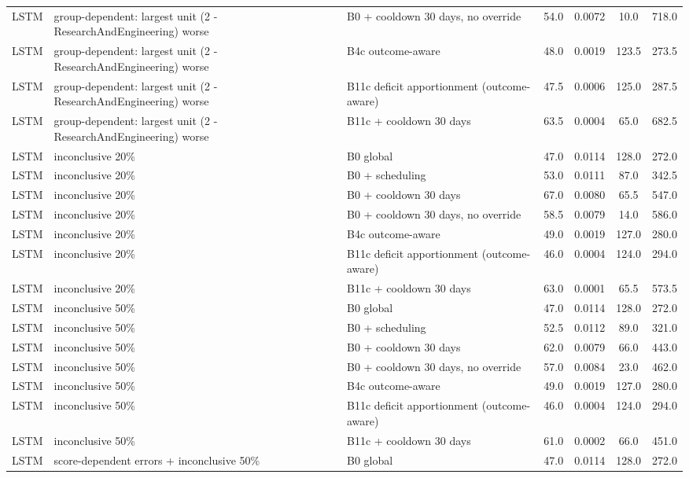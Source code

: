 \documentclass[10pt,onecolumn,letterpaper]{article}
\begin{document}
\begin{longtable}{lp{5.2cm}p{4.4cm}cccc}
LSTM & group-dependent: largest unit (2 - ResearchAndEngineering) worse & B0 + cooldown 30 days, no override & 54.0 & 0.0072 & 10.0 & 718.0 \\
LSTM & group-dependent: largest unit (2 - ResearchAndEngineering) worse & B4c outcome-aware & 48.0 & 0.0019 & 123.5 & 273.5 \\
LSTM & group-dependent: largest unit (2 - ResearchAndEngineering) worse & B11c deficit apportionment (outcome-aware) & 47.5 & 0.0006 & 125.0 & 287.5 \\
LSTM & group-dependent: largest unit (2 - ResearchAndEngineering) worse & B11c + cooldown 30 days & 63.5 & 0.0004 & 65.0 & 682.5 \\
LSTM & inconclusive 20\% & B0 global & 47.0 & 0.0114 & 128.0 & 272.0 \\
LSTM & inconclusive 20\% & B0 + scheduling & 53.0 & 0.0111 & 87.0 & 342.5 \\
LSTM & inconclusive 20\% & B0 + cooldown 30 days & 67.0 & 0.0080 & 65.5 & 547.0 \\
LSTM & inconclusive 20\% & B0 + cooldown 30 days, no override & 58.5 & 0.0079 & 14.0 & 586.0 \\
LSTM & inconclusive 20\% & B4c outcome-aware & 49.0 & 0.0019 & 127.0 & 280.0 \\
LSTM & inconclusive 20\% & B11c deficit apportionment (outcome-aware) & 46.0 & 0.0004 & 124.0 & 294.0 \\
LSTM & inconclusive 20\% & B11c + cooldown 30 days & 63.0 & 0.0001 & 65.5 & 573.5 \\
LSTM & inconclusive 50\% & B0 global & 47.0 & 0.0114 & 128.0 & 272.0 \\
LSTM & inconclusive 50\% & B0 + scheduling & 52.5 & 0.0112 & 89.0 & 321.0 \\
LSTM & inconclusive 50\% & B0 + cooldown 30 days & 62.0 & 0.0079 & 66.0 & 443.0 \\
LSTM & inconclusive 50\% & B0 + cooldown 30 days, no override & 57.0 & 0.0084 & 23.0 & 462.0 \\
LSTM & inconclusive 50\% & B4c outcome-aware & 49.0 & 0.0019 & 127.0 & 280.0 \\
LSTM & inconclusive 50\% & B11c deficit apportionment (outcome-aware) & 46.0 & 0.0004 & 124.0 & 294.0 \\
LSTM & inconclusive 50\% & B11c + cooldown 30 days & 61.0 & 0.0002 & 66.0 & 451.0 \\
LSTM & score-dependent errors + inconclusive 50\% & B0 global & 47.0 & 0.0114 & 128.0 & 272.0 \\

\end{longtable}
\end{document}
